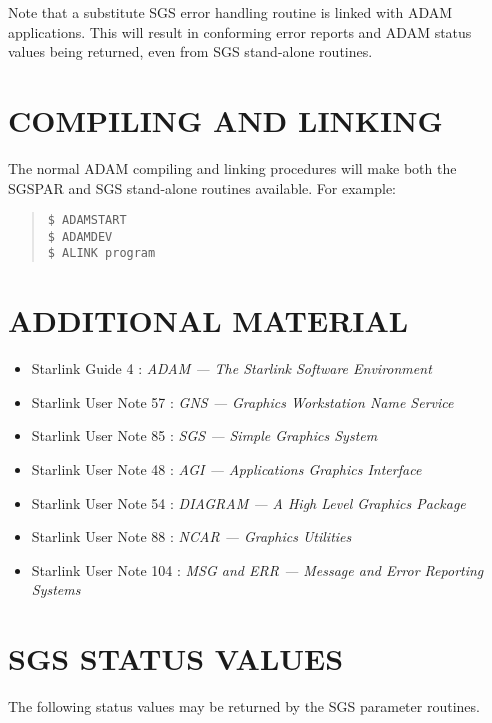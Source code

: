 Note that a substitute SGS error handling routine is linked with ADAM
applications.
This will result in conforming error reports and ADAM status values being
returned, even from SGS stand-alone routines.

\section{COMPILING AND LINKING}
The normal ADAM compiling and linking procedures will make both the SGSPAR
and SGS stand-alone routines available.
For example:
\begin{quote}
\begin{verbatim}
$ ADAMSTART
$ ADAMDEV
$ ALINK program
\end{verbatim}
\end{quote}

\section{ADDITIONAL MATERIAL}
\begin{itemize}
\item Starlink Guide 4 : {\it ADAM --- The Starlink Software Environment}
\item Starlink User Note 57 : {\it GNS --- Graphics Workstation Name Service}
\item Starlink User Note 85 : {\it SGS --- Simple Graphics System}
\item Starlink User Note 48 : {\it AGI --- Applications Graphics Interface}
\item Starlink User Note 54 : {\it DIAGRAM --- A High Level Graphics Package}
\item Starlink User Note 88 : {\it NCAR --- Graphics Utilities}
\item Starlink User Note 104 : {\it MSG and ERR --- Message and Error Reporting
Systems}
\end{itemize}

\section{SGS STATUS VALUES}
\label{errs}
The following status values may be returned by the SGS parameter
routines.

